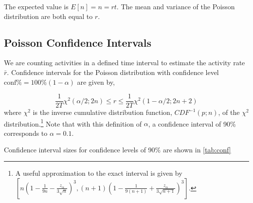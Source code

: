 \documentclass{article}
\begin{document}
The expected value is $E[n]=n=rt$. The mean and variance of the Poisson distribution are both equal to $r$.

\subsection{Poisson Confidence Intervals} 

We are counting activities in a defined time interval to estimate the activity rate $\bar{r}$. Confidence intervals for the
Poisson distribution with confidence level $\text{conf\%} = 100\%(1-\alpha)$ are given by,

\begin{equation}
    \label{eq:chisqconf}
    \frac{1}{2T} \chi^2(\alpha/2;2n) \leq r \leq \frac{1}{2T} \chi^2(1-\alpha/2;2n+2)
\end{equation}
where $\chi^2$ is the inverse cumulative distribution function, $CDF^{-1}(p; n)$, of the $\chi^2$ distribution.\footnote{A useful approximation to the exact interval is given by  $[ n(1 - \frac{1}{9n} - \frac{z_{\alpha}}{3\sqrt{n}})^3 , (n+1)(1- \frac{1}{9(n+1)} + \frac{z_{\alpha}}{3\sqrt{n+1}})^3]$. }
Note that with this definition of $\alpha$, a confidence interval of 90\% corresponds to $\alpha=0.1$.

Confidence interval sizes for confidence levels of 90\% are shown in \ref{tab:conf}
\end{document}
